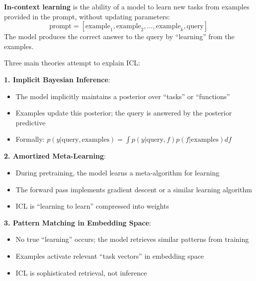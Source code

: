\begin{definition}
    \textbf{In-context learning} is the ability of a model to learn new tasks from examples provided in the prompt, without updating parameters:
    \[
        \text{prompt} = [\text{example}_1, \text{example}_2, \ldots, \text{example}_k, \text{query}]
    \]
    The model produces the correct answer to the query by ``learning'' from the examples.
\end{definition}

\begin{remark}
    Three main theories attempt to explain ICL:

    \textbf{1. Implicit Bayesian Inference}:
    \begin{itemize}
        \item The model implicitly maintains a posterior over ``tasks'' or ``functions''
        \item Examples update this posterior; the query is answered by the posterior predictive
        \item Formally: $p(y | \text{query}, \text{examples}) = \int p(y | \text{query}, f) p(f | \text{examples}) df$
    \end{itemize}

    \textbf{2. Amortized Meta-Learning}:
    \begin{itemize}
        \item During pretraining, the model learns a meta-algorithm for learning
        \item The forward pass implements gradient descent or a similar learning algorithm
        \item ICL is ``learning to learn'' compressed into weights
    \end{itemize}

    \textbf{3. Pattern Matching in Embedding Space}:
    \begin{itemize}
        \item No true ``learning'' occurs; the model retrieves similar patterns from training
        \item Examples activate relevant ``task vectors'' in embedding space
        \item ICL is sophisticated retrieval, not inference
    \end{itemize}
\end{remark}

